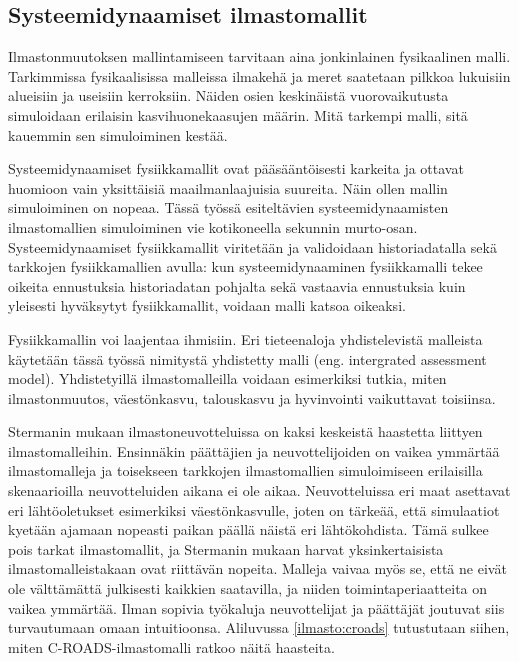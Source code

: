 \documentclass[finnish,12pt,a4paper,pdftex]{article}
\begin{document}
\begin{onehalfspacing}
\subsection{Systeemidynaamiset ilmastomallit \label{ilmasto:sysdyn}}

Ilmastonmuutoksen mallintamiseen tarvitaan aina jonkinlainen fysikaalinen malli. Tarkimmissa fysikaalisissa malleissa ilmakehä ja meret saatetaan pilkkoa lukuisiin alueisiin ja useisiin kerroksiin. Näiden osien keskinäistä vuorovaikutusta simuloidaan erilaisin kasvihuonekaasujen määrin. Mitä tarkempi malli, sitä kauemmin sen simuloiminen kestää. \cite{CroadsFlightSimulator2011} 

Systeemidynaamiset fysiikkamallit ovat pääsääntöisesti karkeita ja ottavat huomioon vain yksittäisiä maailmanlaajuisia suureita. Näin ollen mallin simuloiminen on nopeaa. Tässä työssä esiteltävien systeemidynaamisten ilmastomallien simuloiminen vie kotikoneella sekunnin murto-osan. Systeemidynaamiset fysiikkamallit viritetään ja validoidaan historiadatalla sekä tarkkojen fysiikkamallien avulla: kun systeemidynaaminen fysiikkamalli tekee oikeita ennustuksia historiadatan pohjalta sekä vastaavia ennustuksia kuin yleisesti hyväksytyt fysiikkamallit, voidaan malli katsoa oikeaksi. \cite{Fiddaman2002, CroadsFlightSimulator2011} 

Fysiikkamallin voi laajentaa ihmisiin. Eri tieteenaloja yhdistelevistä malleista käytetään tässä työssä nimitystä yhdistetty malli (eng. intergrated assessment model). Yhdistetyillä ilmastomalleilla voidaan esimerkiksi tutkia, miten ilmastonmuutos, väestönkasvu, talouskasvu ja hyvinvointi vaikuttavat toisiinsa. \cite{U.S.DepartmentofEnergy2009} 

Stermanin \cite{CroadsFlightSimulator2011} mukaan ilmastoneuvotteluissa on kaksi keskeistä haastetta liittyen ilmastomalleihin. Ensinnäkin päättäjien ja neuvottelijoiden on vaikea ymmärtää ilmastomalleja ja toisekseen tarkkojen ilmastomallien simuloimiseen erilaisilla skenaarioilla neuvotteluiden aikana ei ole aikaa. Neuvotteluissa eri maat asettavat eri lähtöoletukset esimerkiksi väestönkasvulle, joten on tärkeää, että simulaatiot kyetään ajamaan nopeasti paikan päällä näistä eri lähtökohdista. Tämä sulkee pois tarkat ilmastomallit, ja Stermanin \cite{CroadsFlightSimulator2011} mukaan harvat yksinkertaisista ilmastomalleistakaan ovat riittävän nopeita. Malleja vaivaa myös se, että ne eivät ole välttämättä julkisesti kaikkien saatavilla, ja niiden toimintaperiaatteita on vaikea ymmärtää. Ilman sopivia työkaluja neuvottelijat ja päättäjät joutuvat siis turvautumaan omaan intuitioonsa. Aliluvussa \ref{ilmasto:croads} tutustutaan siihen, miten C-ROADS-ilmastomalli ratkoo näitä haasteita. 


\end{onehalfspacing}
\end{document}
